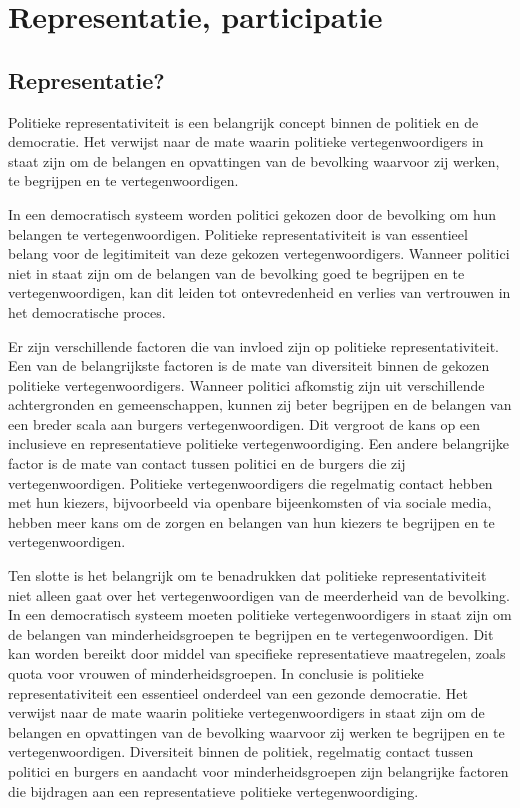 \chapter{Representatie, participatie}

\section{Representatie?}
Politieke representativiteit is een belangrijk concept binnen de politiek en de democratie. Het verwijst naar de mate waarin politieke vertegenwoordigers in staat zijn om de belangen en opvattingen van de bevolking waarvoor zij werken, te begrijpen en te vertegenwoordigen.

In een democratisch systeem worden politici gekozen door de bevolking om hun belangen te vertegenwoordigen. Politieke representativiteit is van essentieel belang voor de legitimiteit van deze gekozen vertegenwoordigers. Wanneer politici niet in staat zijn om de belangen van de bevolking goed te begrijpen en te vertegenwoordigen, kan dit leiden tot ontevredenheid en verlies van vertrouwen in het democratische proces.

Er zijn verschillende factoren die van invloed zijn op politieke representativiteit. Een van de belangrijkste factoren is de mate van diversiteit binnen de gekozen politieke vertegenwoordigers. Wanneer politici afkomstig zijn uit verschillende achtergronden en gemeenschappen, kunnen zij beter begrijpen en de belangen van een breder scala aan burgers vertegenwoordigen. Dit vergroot de kans op een inclusieve en representatieve politieke vertegenwoordiging.
Een andere belangrijke factor is de mate van contact tussen politici en de burgers die zij vertegenwoordigen. Politieke vertegenwoordigers die regelmatig contact hebben met hun kiezers, bijvoorbeeld via openbare bijeenkomsten of via sociale media, hebben meer kans om de zorgen en belangen van hun kiezers te begrijpen en te vertegenwoordigen.

Ten slotte is het belangrijk om te benadrukken dat politieke representativiteit niet alleen gaat over het vertegenwoordigen van de meerderheid van de bevolking. In een democratisch systeem moeten politieke vertegenwoordigers in staat zijn om de belangen van minderheidsgroepen te begrijpen en te vertegenwoordigen. Dit kan worden bereikt door middel van specifieke representatieve maatregelen, zoals quota voor vrouwen of minderheidsgroepen.
In conclusie is politieke representativiteit een essentieel onderdeel van een gezonde democratie. Het verwijst naar de mate waarin politieke vertegenwoordigers in staat zijn om de belangen en opvattingen van de bevolking waarvoor zij werken te begrijpen en te vertegenwoordigen. Diversiteit binnen de politiek, regelmatig contact tussen politici en burgers en aandacht voor minderheidsgroepen zijn belangrijke factoren die bijdragen aan een representatieve politieke vertegenwoordiging.

